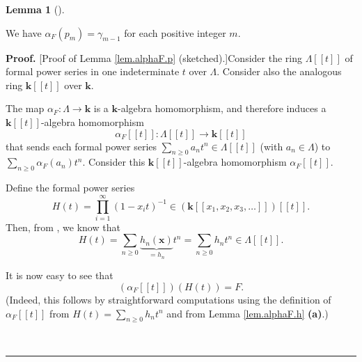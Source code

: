 \documentclass[numbers=enddot,12pt,final,onecolumn,notitlepage]{scrartcl}%
\theoremstyle{definition}
\newtheorem{lem}[theo]{Lemma}
\newenvironment{lemma}[1][]
{\begin{lem}[#1]\begin{leftbar}}
{\end{leftbar}\end{lem}}
\newenvironment{proof}[1][Proof]{\noindent\textbf{#1.} }{\ \rule{0.5em}{0.5em}}
\let\sumnonlimits\sum
\let\prodnonlimits\prod
\renewcommand{\sum}{\sumnonlimits\limits}
\renewcommand{\prod}{\prodnonlimits\limits}
\newenvironment{vershort}{}{}
\begin{document}
\begin{lemma}
\label{lem.alphaF.p}We have $\alpha_{F}\left(  p_{m}\right)  =\gamma_{m-1}$
for each positive integer $m$.
\end{lemma}

\begin{vershort}
\begin{proof}
[Proof of Lemma \ref{lem.alphaF.p} (sketched).]Consider the ring
$\Lambda\left[  \left[  t\right]  \right]  $ of formal power series in one
indeterminate $t$ over $\Lambda$. Consider also the analogous ring
$\mathbf{k}\left[  \left[  t\right]  \right]  $ over $\mathbf{k}$.

The map $\alpha_{F}:\Lambda\rightarrow\mathbf{k}$ is a $\mathbf{k}$-algebra
homomorphism, and therefore induces a $\mathbf{k}\left[  \left[  t\right]
\right]  $-algebra homomorphism%
\[
\alpha_{F}\left[  \left[  t\right]  \right]  :\Lambda\left[  \left[  t\right]
\right]  \rightarrow\mathbf{k}\left[  \left[  t\right]  \right]
\]
that sends each formal power series $\sum_{n\geq0}a_{n}t^{n}\in\Lambda\left[
\left[  t\right]  \right]  $ (with $a_{n}\in\Lambda$) to $\sum_{n\geq0}%
\alpha_{F}\left(  a_{n}\right)  t^{n}$. Consider this $\mathbf{k}\left[
\left[  t\right]  \right]  $-algebra homomorphism $\alpha_{F}\left[  \left[
t\right]  \right]  $.

Define the formal power series
\begin{equation}
H\left(  t\right)  =\prod_{i=1}^{\infty}\left(  1-x_{i}t\right)  ^{-1}%
\in\left(  \mathbf{k}\left[  \left[  x_{1},x_{2},x_{3},\ldots\right]  \right]
\right)  \left[  \left[  t\right]  \right]  .
\label{pf.lem.alphaF.p.short.Ht=}%
\end{equation}
Then, from \cite[(2.4.1)]{GriRei}, we know that%
\[
H\left(  t\right)  =\sum_{n\geq0}\underbrace{h_{n}\left(  \mathbf{x}\right)
}_{=h_{n}}t^{n}=\sum_{n\geq0}h_{n}t^{n}\in\Lambda\left[  \left[  t\right]
\right]  .
\]


It is now easy to see that
\begin{equation}
\left(  \alpha_{F}\left[  \left[  t\right]  \right]  \right)  \left(  H\left(
t\right)  \right)  =F. \label{pf.lem.alphaF.p.short.5}%
\end{equation}
(Indeed, this follows by straightforward computations using the definition of
$\alpha_{F}\left[  \left[  t\right]  \right]  $ from $H\left(  t\right)
=\sum_{n\geq0}h_{n}t^{n}$ and from Lemma \ref{lem.alphaF.h} \textbf{(a)}.)


\end{proof}
\end{vershort}
\end{document}
